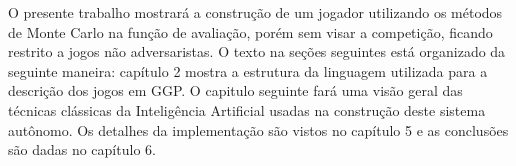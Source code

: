O presente trabalho mostrará a construção de um jogador utilizando os métodos de Monte Carlo na função de avaliação, porém sem visar a competição, ficando restrito a jogos não adversaristas. O texto na seções seguintes está organizado da seguinte maneira: capítulo 2 mostra a estrutura da linguagem utilizada para a descrição dos jogos em GGP. O capitulo seguinte fará uma visão geral das técnicas clássicas da Inteligência Artificial usadas na construção deste sistema autônomo. Os detalhes da implementação são vistos no capítulo 5 e as conclusões são dadas no capítulo 6.